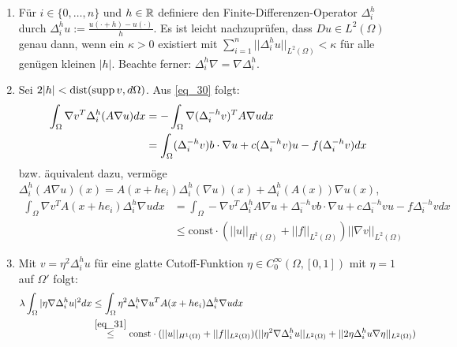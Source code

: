 	\begin{enumerate}[1.]
		\item Für $i \in \{0,\dots,n\}$ und $h \in \mathbb{R}$ definiere den Finite-Differenzen-Operator $\Delta_i^h$ durch $\Delta_i^h u := \frac{u(\cdot +h)-u(\cdot)}{h}$. Es ist leicht nachzuprüfen, dass $Du \in L^2(\Omega)$ genau dann, wenn ein $\kappa > 0$ existiert mit $\sum_{i=1}^{n} ||\Delta_i^h u||_{L^2(\Omega)} < \kappa$ für alle genügen kleinen $|h|$. Beachte ferner: $\Delta_i^h \nabla = \nabla \Delta^h_i$.
		\item Sei $2|h| < \operatorname{dist}(\operatorname{supp} v, d\Omega)$. Aus \eqref{eq_30} folgt:
		\begin{equation}
		\begin{aligned}
			\int_{\Omega} \nabla v^T \Delta^h_i(A \nabla u) dx &= -\int_\Omega \nabla (\Delta_i^{-h} v)^T A \nabla u dx \\ \notag
			&= \int_{\Omega} (\Delta_i^{-h} v)b \cdot \nabla u + c(\Delta_i^{-h}v)u - f(\Delta_i^{-h}v) dx
		\end{aligned}
		\end{equation}
		bzw. äquivalent dazu, vermöge $\Delta_i^h(A \nabla u)(x) = A(x+he_i)\Delta_i^h(\nabla u)(x) + \Delta_i^h(A(x)) \nabla u(x)$,
		\begin{equation}
		\begin{aligned}
			\int_\Omega \nabla v^T A(x+he_i) \Delta_i^h \nabla u dx &= \int_{\Omega} -\nabla v^T \Delta_i^h A \nabla u + \Delta_i^{-h} vb \cdot \nabla u + c \Delta_i^{-h} vu - f \Delta_i^{-h} v dx \\ \label{eq_31}
			&\leq \text{const} \cdot (||u||_{H^1(\Omega)} + ||f||_{L^2(\Omega)}) || \nabla v||_{L^2(\Omega)}
		\end{aligned}
		\end{equation}
		\item Mit $v = \eta^2 \Delta_i^h u$ für eine glatte Cutoff-Funktion $\eta \in C_0^\infty(\Omega,[0,1])$ mit $\eta = 1$ auf $\Omega'$ folgt:
		\begin{equation}
		\begin{aligned}
			\lambda \int_{\Omega} |\eta \nabla \Delta_i^h u|^2 dx &\leq \int_{\Omega} \eta^2 \Delta_i^h \nabla u^T A(x+he_i) \Delta_i^h \nabla u dx \\ \notag
			&\overset{\eqref{eq_31}}{\leq} \text{const} \cdot (||u||_{H^1(\Omega)} + ||f||_{L^2(\Omega)})(||\eta^2 \nabla \Delta_i^h u||_{L^2(\Omega)} + ||2\eta \Delta_i^h u \nabla \eta||_{L^2(\Omega)})
		\end{aligned}
		\end{equation}

\end{enumerate}
